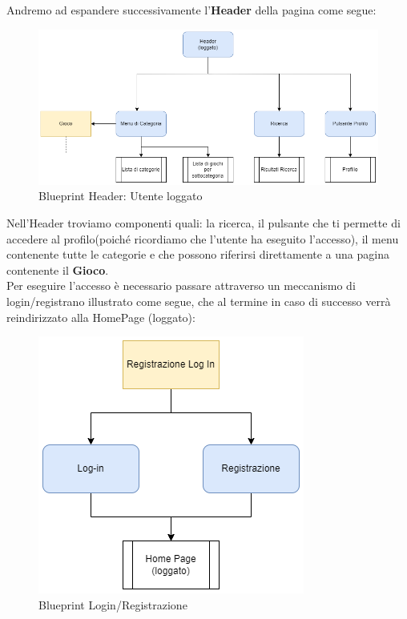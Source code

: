\documentclass[../Report.tex]{subfiles}
\begin{document}
    Andremo ad espandere successivamente l'\textbf{Header} della pagina come segue:

    \begin{figure}[H]
        \includegraphics[width=\linewidth]{BP_HeaderLog.png}
        \centering
        \caption{Blueprint Header: Utente loggato}
    \end{figure}

    Nell'Header troviamo componenti quali: la ricerca, il pulsante che ti permette di accedere al profilo(poiché ricordiamo che l'utente ha eseguito l'accesso), il menu contenente tutte le categorie e che possono riferirsi direttamente a una pagina contenente il \textbf{Gioco}.\\

    Per eseguire l'accesso è necessario passare attraverso un meccanismo di login/registrano illustrato come segue, che al termine in caso di successo verrà reindirizzato alla HomePage (loggato):

    \begin{figure}[H]
        \includegraphics[width=.6\linewidth]{BP_registrazione login.png}
        \centering
        \caption{Blueprint Login/Registrazione}
    \end{figure}
\end{document}
